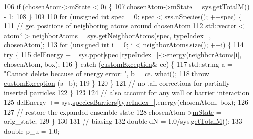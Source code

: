\begin{DoxyCode}
106             \textcolor{keywordflow}{if} (chosenAtom->\hyperlink{classatom_a3cb00c0c5b7533657e05af6ff4a42740}{mState} < 0) \{
107                 chosenAtom->\hyperlink{classatom_a3cb00c0c5b7533657e05af6ff4a42740}{mState} = sys.\hyperlink{classsim_system_aa4ad1afff101bb530e1590df05035276}{getTotalM}() - 1;
108             \}
109 
110             \textcolor{keywordflow}{for} (\textcolor{keywordtype}{unsigned} \textcolor{keywordtype}{int} spec = 0; spec < sys.\hyperlink{classsim_system_ab5e2e9b6204de15520302fe1d51688dd}{nSpecies}(); ++spec) \{
111                 \textcolor{comment}{// get positions of neighboring atoms around chosenAtom}
112                     std::vector < atom* > neighborAtoms = sys.\hyperlink{classsim_system_a9b3aeefa22c3b50b5913df6eea753bc6}{getNeighborAtoms}(spec, 
      typeIndex\_, chosenAtom);
113                     \textcolor{keywordflow}{for} (\textcolor{keywordtype}{unsigned} \textcolor{keywordtype}{int} i = 0; i < neighborAtoms.size(); ++i) \{
114                         \textcolor{keywordflow}{try} \{
115                         delEnergy += sys.\hyperlink{classsim_system_ad2e290b5963f132e6a3a56cee35c8e9f}{ppot}[spec][\hyperlink{classmc_move_acb731965547b0326ef318ec96da8b46a}{typeIndex\_}]->energy(neighborAtoms[i], 
      chosenAtom, box);
116                     \} \textcolor{keywordflow}{catch} (\hyperlink{classcustom_exception}{customException}& ce) \{
117                         std::string a = \textcolor{stringliteral}{"Cannot delete because of energy error: "}, b = ce.
      \hyperlink{classcustom_exception_aeb6ab5848b038adfc68fde86a512f691}{what}();
118                         \textcolor{keywordflow}{throw} \hyperlink{classcustom_exception}{customException} (a+b);
119                     \}
120                     \}
121                     \textcolor{comment}{// no tail corrections for partially inserted particles}
122             \}
123 
124             \textcolor{comment}{// also account for any wall or barrier interaction}
125             delEnergy += sys.\hyperlink{classsim_system_a5ae652ff4519f39c3862abae32a9581b}{speciesBarriers}[\hyperlink{classmc_move_acb731965547b0326ef318ec96da8b46a}{typeIndex\_}].energy(chosenAtom, box);
126 
127             \textcolor{comment}{// restore the expanded ensemble state}
128             chosenAtom->\hyperlink{classatom_a3cb00c0c5b7533657e05af6ff4a42740}{mState} = orig\_state;
129         \}
130 
131         \textcolor{comment}{// biasing}
132         \textcolor{keywordtype}{double} dN = 1.0/sys.\hyperlink{classsim_system_aa4ad1afff101bb530e1590df05035276}{getTotalM}();
133     \textcolor{keywordtype}{double} p\_u = 1.0;

\end{DoxyCode}
